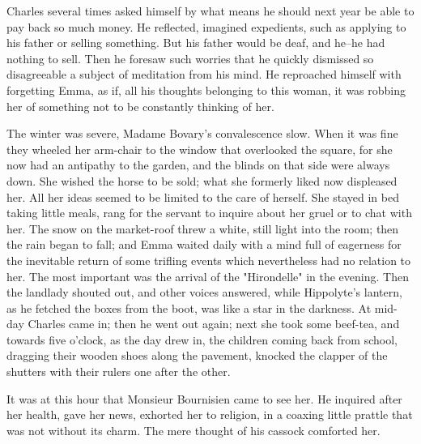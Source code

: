 \documentclass[11pt,twocolumn]{ltugboat}
\begin{document}
Charles several times asked himself by what means he should next year be
able to pay back so much money. He reflected, imagined expedients, such
as applying to his father or selling something. But his father would be
deaf, and he--he had nothing to sell. Then he foresaw such worries that
he quickly dismissed so disagreeable a subject of meditation from
his mind. He reproached himself with forgetting Emma, as if, all his
thoughts belonging to this woman, it was robbing her of something not to
be constantly thinking of her.

The winter was severe, Madame Bovary's convalescence slow. When it
was fine they wheeled her arm-chair to the window that overlooked the
square, for she now had an antipathy to the garden, and the blinds on
that side were always down. She wished the horse to be sold; what she
formerly liked now displeased her. All her ideas seemed to be limited to
the care of herself. She stayed in bed taking little meals, rang for the
servant to inquire about her gruel or to chat with her. The snow on
the market-roof threw a white, still light into the room; then the rain
began to fall; and Emma waited daily with a mind full of eagerness for
the inevitable return of some trifling events which nevertheless had no
relation to her. The most important was the arrival of the "Hirondelle"
in the evening. Then the landlady shouted out, and other voices
answered, while Hippolyte's lantern, as he fetched the boxes from the
boot, was like a star in the darkness. At mid-day Charles came in;
then he went out again; next she took some beef-tea, and towards five
o'clock, as the day drew in, the children coming back from school,
dragging their wooden shoes along the pavement, knocked the clapper of
the shutters with their rulers one after the other.

It was at this hour that Monsieur Bournisien came to see her. He
inquired after her health, gave her news, exhorted her to religion, in a
coaxing little prattle that was not without its charm. The mere thought
of his cassock comforted her.
\end{document}
